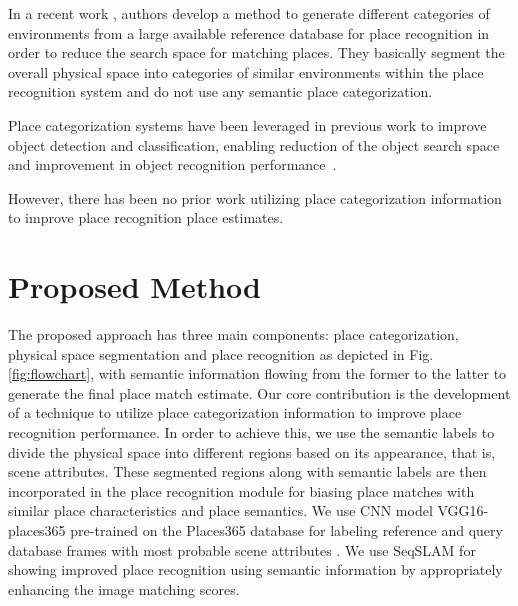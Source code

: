 \documentclass[letterpaper, 10 pt, conference]{ieeeconf}  %
\begin{document}
In a recent work \cite{mohan2015environment}, authors develop a method to generate different categories of environments from a large available reference database for place recognition in order to reduce the search space for matching places. They basically segment the overall physical space into categories of similar environments within the place recognition system and do not use any semantic place categorization.

Place categorization systems have been leveraged in previous work to improve object detection and classification, enabling reduction of the object search space and improvement in object recognition performance~\cite{torralba2003context}. 

However, there has been no prior work utilizing place categorization information to improve place recognition place estimates. 




\section{Proposed Method}
The proposed approach has three main components: place categorization, physical space segmentation and place recognition as depicted in Fig. \ref{fig:flowchart}, with semantic information flowing from the former to the latter to generate the final place match estimate. Our core contribution is the development of a technique to utilize place categorization information to improve place recognition performance. In order to achieve this, we use the semantic labels to divide the physical space into different regions based on its appearance, that is, scene attributes. These segmented regions along with semantic labels are then incorporated in the place recognition module for biasing place matches with similar place characteristics and place semantics. We use CNN model VGG16-places365 \cite{cnnPlaces365Github} pre-trained on the Places365 database \cite{zhou2014learning} for labeling reference and query database frames with most probable scene attributes \cite{Patterson2012SunAttributes}. We use SeqSLAM \cite{Milford2012} for showing improved place recognition using semantic information by appropriately enhancing the image matching scores.
\end{document}
